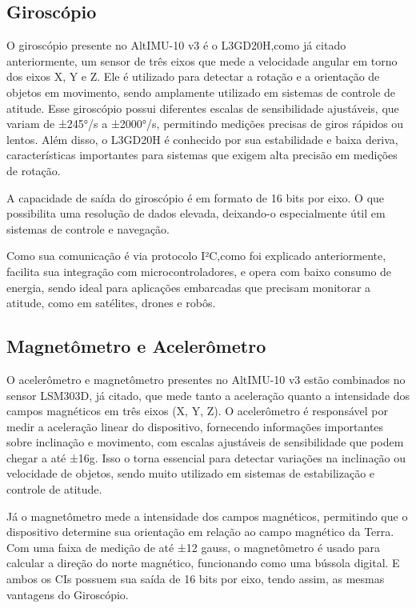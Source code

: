 \documentclass[
	12pt,				%
	openright,			%
	oneside,			%
	a4paper,			%
	english,			%
	brazil				%
	]{abntex2}
\begin{document}
\subsection{Giroscópio}
O giroscópio presente no AltIMU-10 v3 é o L3GD20H,como já citado anteriormente, um sensor de três eixos que mede a velocidade angular em torno dos eixos X, Y e Z. Ele é utilizado para detectar a rotação e a orientação de objetos em movimento, sendo amplamente utilizado em sistemas de controle de atitude. Esse giroscópio possui diferentes escalas de sensibilidade ajustáveis, que variam de ±245°/s a ±2000°/s, permitindo medições precisas de giros rápidos ou lentos. Além disso, o L3GD20H é conhecido por sua estabilidade e baixa deriva, características importantes para sistemas que exigem alta precisão em medições de rotação. 

A capacidade de saída do giroscópio é em formato de 16 bits por eixo. O que possibilita uma resolução de dados elevada, deixando-o especialmente útil em sistemas de controle e navegação.

Como sua comunicação é via protocolo I²C,como foi explicado anteriormente, facilita sua integração com microcontroladores, e opera com baixo consumo de energia, sendo ideal para aplicações embarcadas que precisam monitorar a atitude, como em satélites, drones e robôs.

\subsection{Magnetômetro e Acelerômetro}
O acelerômetro e magnetômetro presentes no AltIMU-10 v3 estão combinados no sensor LSM303D, já citado, que mede tanto a aceleração quanto a intensidade dos campos magnéticos em três eixos (X, Y, Z). O acelerômetro é responsável por medir a aceleração linear do dispositivo, fornecendo informações importantes sobre inclinação e movimento, com escalas ajustáveis de sensibilidade que podem chegar a até ±16g. Isso o torna essencial para detectar variações na inclinação ou velocidade de objetos, sendo muito utilizado em sistemas de estabilização e controle de atitude.

Já o magnetômetro mede a intensidade dos campos magnéticos, permitindo que o dispositivo determine sua orientação em relação ao campo magnético da Terra. Com uma faixa de medição de até ±12 gauss, o magnetômetro é usado para calcular a direção do norte magnético, funcionando como uma bússola digital. E ambos os CIs possuem sua saída de 16 bits por eixo, tendo assim, as mesmas vantagens do Giroscópio.
\end{document}
